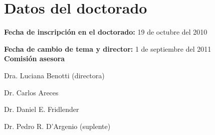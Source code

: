 \section{Datos del doctorado}
\label{datos}

{\bf Fecha de inscripci\'on en el doctorado:} 19 de octubre del 2010

{\bf Fecha de cambio de tema y director:} 1 de septiembre del 2011\\

{\bf Comisi\'on asesora}


Dra. Luciana Benotti (directora)

Dr. Carlos Areces

Dr. Daniel E. Fridlender

Dr. Pedro R. D'Argenio (suplente)


